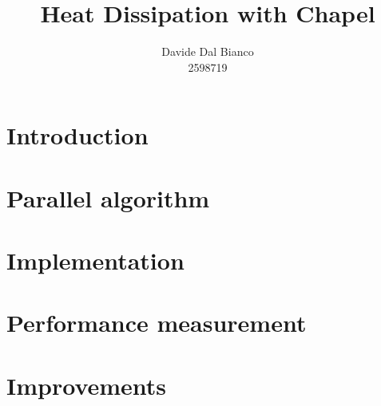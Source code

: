 \documentclass{article}
\title{Heat Dissipation with Chapel}
\author{Davide Dal Bianco \\ 2598719}
\begin{document}
\maketitle

\section{Introduction}

\section{Parallel algorithm}

\section{Implementation}

\section{Performance measurement}

\section{Improvements}
\end{document}
